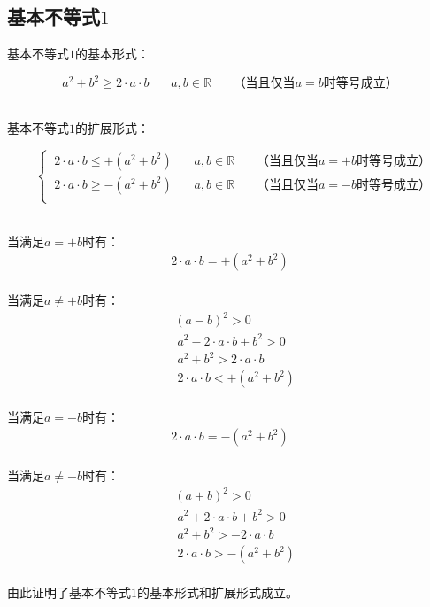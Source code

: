 \documentclass[UTF8]{ctexart}
\begin{document}
\newpage

\subsection{基本不等式$1$}
    基本不等式$1$的基本形式：
    \begin{large}
        \begin{equation*}
            a^2+b^2 \geq 2\cdot a\cdot b~~~~~~~~a,b\in\mathbb{R}~~~~~~~~\text{（当且仅当$a=b$时等号成立）}
        \end{equation*}
    \end{large}\\
    基本不等式$1$的扩展形式：\vspace{3pt}
    \begin{large}
        \begin{equation*}
            ~~~~
            \begin{cases}
                ~2\cdot a\cdot b\leq+(a^2+b^2) ~~~~~~~~a,b\in\mathbb{R}~~~~~~~~\text{（当且仅当$a=+b$时等号成立）}\\[1mm]
                ~2\cdot a\cdot b\geq-(a^2+b^2)~~~~~~~~a,b\in\mathbb{R}~~~~~~~~\text{（当且仅当$a=-b$时等号成立）}\\[1mm]
            \end{cases}
        \end{equation*}
    \end{large}\\[5mm]
    当满足$a=+b$时有：
    \setcounter{equation}{0}
    \begin{align}
        2\cdot a\cdot b=+(a^2+b^2)
    \end{align}\\
    当满足$a\neq +b$时有：
    \begin{align}
        &(a-b)^2>0\\[2mm]
        &~a^2-2\cdot a\cdot b+b^2>0\\[2mm]
        &~a^2+b^2>2\cdot a\cdot b\\[2mm]
        &~2\cdot a\cdot b<+(a^2+b^2)
    \end{align}\\
    当满足$a=-b$时有：
    \begin{align}
        2\cdot a\cdot b=-(a^2+b^2)
    \end{align}\\
    当满足$a\neq -b$时有：
    \begin{align}
        &(a+b)^2>0\\[2mm]
        &~a^2+2\cdot a\cdot b+b^2>0\\[2mm]
        &~a^2+b^2>-2\cdot a\cdot b\\[2mm]
        &~2\cdot a\cdot b>-(a^2+b^2)
    \end{align}\\
    由此证明了基本不等式$1$的基本形式和扩展形式成立。
\end{document}
